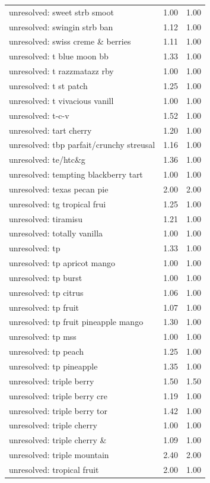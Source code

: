 \begin{table}
\begin{tabular}{lrr}
unresolved: sweet strb smoot & 1.00 & 1.00 \\
unresolved: swingin strb ban & 1.12 & 1.00 \\
unresolved: swiss creme \& berries & 1.11 & 1.00 \\
unresolved: t blue moon bb & 1.33 & 1.00 \\
unresolved: t razzmatazz rby & 1.00 & 1.00 \\
unresolved: t st patch & 1.25 & 1.00 \\
unresolved: t vivacious vanill & 1.00 & 1.00 \\
unresolved: t-c-v & 1.52 & 1.00 \\
unresolved: tart cherry & 1.20 & 1.00 \\
unresolved: tbp parfait/crunchy streusal & 1.16 & 1.00 \\
unresolved: te/htc\&g & 1.36 & 1.00 \\
unresolved: tempting blackberry tart & 1.00 & 1.00 \\
unresolved: texas pecan pie & 2.00 & 2.00 \\
unresolved: tg tropical frui & 1.25 & 1.00 \\
unresolved: tiramisu & 1.21 & 1.00 \\
unresolved: totally vanilla & 1.00 & 1.00 \\
unresolved: tp & 1.33 & 1.00 \\
unresolved: tp apricot mango & 1.00 & 1.00 \\
unresolved: tp burst & 1.00 & 1.00 \\
unresolved: tp citrus & 1.06 & 1.00 \\
unresolved: tp fruit & 1.07 & 1.00 \\
unresolved: tp fruit pineapple mango & 1.30 & 1.00 \\
unresolved: tp mss & 1.00 & 1.00 \\
unresolved: tp peach & 1.25 & 1.00 \\
unresolved: tp pineapple & 1.35 & 1.00 \\
unresolved: triple berry & 1.50 & 1.50 \\
unresolved: triple berry cre & 1.19 & 1.00 \\
unresolved: triple berry tor & 1.42 & 1.00 \\
unresolved: triple cherry & 1.00 & 1.00 \\
unresolved: triple cherry \& & 1.09 & 1.00 \\
unresolved: triple mountain & 2.40 & 2.00 \\
unresolved: tropical fruit & 2.00 & 1.00 \\

\end{tabular}
\end{table}
